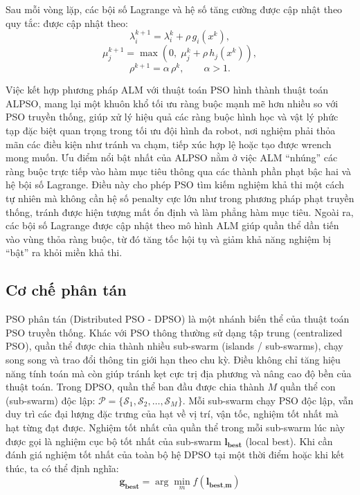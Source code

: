 Sau mỗi vòng lặp, các bội số Lagrange và hệ số tăng cường được cập nhật theo quy tắc: được cập nhật theo:
\begin{equation}
    \lambda_i^{k+1} = \lambda_i^{k} + \rho\, g_i(x^{k}),
\label{eq:lambda}
\end{equation}
\begin{equation}
    \mu_j^{k+1} = \max\!\left( 0,\; \mu_j^{k} + \rho\, h_j(x^{k}) \right),
\label{eq:mu}
\end{equation}
\begin{equation}
    \rho^{k+1} = \alpha\, \rho^{k}, \qquad \alpha > 1.
\label{eq:rho}
\end{equation}

Việc kết hợp phương pháp ALM với thuật toán PSO hình thành thuật toán ALPSO, mang lại một khuôn khổ tối ưu ràng buộc mạnh mẽ hơn nhiều so với PSO truyền thống, giúp xử lý hiệu quả các ràng buộc hình học và vật lý phức tạp đặc biệt quan trọng trong tối ưu đội hình đa robot, nơi nghiệm phải thỏa mãn các điều kiện như tránh va chạm, tiếp xúc hợp lệ hoặc tạo được wrench mong muốn. Ưu điểm nổi bật nhất của ALPSO nằm ở việc ALM “nhúng” các ràng buộc trực tiếp vào hàm mục tiêu thông qua các thành phần phạt bậc hai và hệ bội số Lagrange. Điều này cho phép PSO tìm kiếm nghiệm khả thi một cách tự nhiên mà không cần hệ số penalty cực lớn như trong phương pháp phạt truyền thống, tránh được hiện tượng mất ổn định và làm phẳng hàm mục tiêu. Ngoài ra, các bội số Lagrange được cập nhật theo mô hình ALM giúp quần thể dần tiến vào vùng thỏa ràng buộc, từ đó tăng tốc hội tụ và giảm khả năng nghiệm bị “bật” ra khỏi miền khả thi.

\subsection{Cơ chế phân tán}
PSO phân tán (Distributed PSO - DPSO) là một nhánh biến thể của thuật toán PSO truyền thống. Khác với PSO thông thường sử dạng tập trung (centralized PSO), quần thể được chia thành nhiều sub-swarm (islands / sub-swarms), chạy song song và trao đổi thông tin giới hạn theo chu kỳ. Điều không chỉ tăng hiệu năng tính toán mà còn giúp tránh kẹt cực trị địa phương và nâng cao độ bền của thuật toán. Trong DPSO, quần thể ban đầu được chia thành $M$ quần thể con (sub-swarm) độc lập: $\mathcal{P} = \{\mathcal{S}_1, \mathcal{S}_2, \ldots, \mathcal{S}_M\}$. Mỗi sub-swarm chạy PSO độc lập, vẫn duy trì các đại lượng đặc trưng của hạt về vị trí, vận tốc, nghiệm tốt nhất mà hạt từng đạt được. Nghiệm tốt nhất của quần thể trong mỗi sub-swarm lúc này được gọi là nghiệm cục bộ tốt nhất của sub-swarm $\mathbf{l_{\text{best}}}$ (local best). Khi cần đánh giá nghiệm tốt nhất của toàn bộ hệ DPSO tại một thời điểm hoặc khi kết thúc, ta có thể định nghĩa:
\begin{equation}
    \mathbf{g_{\text{best}}} = \arg\min_{m} f(\mathbf{l_{\text{best,m}}})
\label{eq:gbest}
\end{equation}

